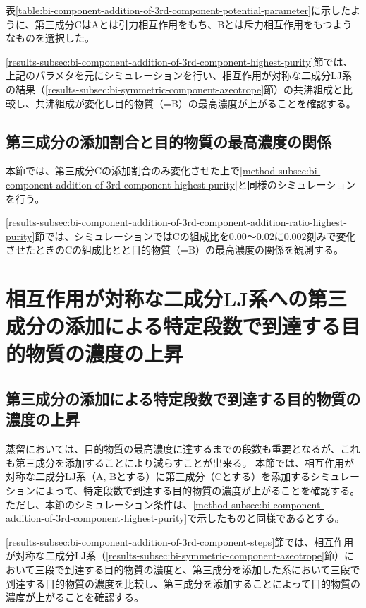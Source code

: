\documentclass[titlepage]{jsreport}
\begin{document}
表\ref{table:bi-component-addition-of-3rd-component-potential-parameter}に示したように、第三成分CはAとは引力相互作用をもち、Bとは斥力相互作用をもつようなものを選択した。

\ref{results-subsec:bi-component-addition-of-3rd-component-highest-purity}節では、上記のパラメタを元にシミュレーションを行い、相互作用が対称な二成分LJ系の結果（\ref{results-subsec:bi-symmetric-component-azeotrope}節）の共沸組成と比較し、共沸組成が変化し目的物質（=B）の最高濃度が上がることを確認する。


\subsection{第三成分の添加割合と目的物質の最高濃度の関係} \label{method-subsec:bi-component-addition-of-3rd-component-addition-ratio-highest-purity}
本節では、第三成分Cの添加割合のみ変化させた上で\ref{method-subsec:bi-component-addition-of-3rd-component-highest-purity}と同様のシミュレーションを行う。

\ref{results-subsec:bi-component-addition-of-3rd-component-addition-ratio-highest-purity}節では、シミュレーションではCの組成比を$0.00〜0.02$に$0.002$刻みで変化させたときのCの組成比とと目的物質（=B）の最高濃度の関係を観測する。


\section{相互作用が対称な二成分LJ系への第三成分の添加による特定段数で到達する目的物質の濃度の上昇} \label{method-sec:bi-component-addition-of-3rd-component-steps}
\subsection{第三成分の添加による特定段数で到達する目的物質の濃度の上昇} \label{method-subsec:bi-component-addition-of-3rd-component-steps}
蒸留においては、目的物質の最高濃度に達するまでの段数も重要となるが、これも第三成分を添加することにより減らすことが出来る\cite{distillation}。
本節では、相互作用が対称な二成分LJ系（A, Bとする）に第三成分（Cとする）を添加するシミュレーションによって、特定段数で到達する目的物質の濃度が上がることを確認する。
ただし、本節のシミュレーション条件は、\ref{method-subsec:bi-component-addition-of-3rd-component-highest-purity}で示したものと同様であるとする。

\ref{results-subsec:bi-component-addition-of-3rd-component-steps}節では、相互作用が対称な二成分LJ系（\ref{results-subsec:bi-symmetric-component-azeotrope}節）において三段で到達する目的物質の濃度と、第三成分を添加した系において三段で到達する目的物質の濃度を比較し、第三成分を添加することによって目的物質の濃度が上がることを確認する。
\end{document}

